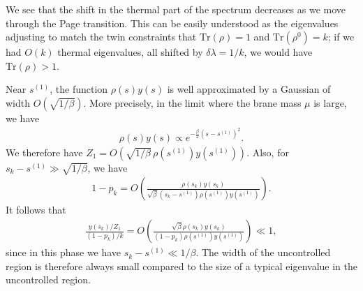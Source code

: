\documentclass[11pt]{article}
\newcommand{\smax}{s_k}
\numberwithin{equation}{section}
\def\Tr{\text{Tr}}
\begin{document}
We see that the shift in the thermal part of the spectrum decreases as we move through the Page transition. This can be easily understood as the eigenvalues adjusting to match the twin constraints that $\Tr(\rho) = 1$ and $\Tr(\rho^0) = k$; if we had $O(k)$ thermal eigenvalues, all shifted by $\delta \lambda = 1/k$, we would have $\Tr(\rho) > 1$.

Near $s^{(1)}$, the function $\rho(s) y(s)$ is well approximated by a Gaussian of width $O(\sqrt{1/\beta})$. More precisely, in the limit where the brane mass $\mu$ is large, we have
\begin{align}
\rho(s)y(s) \propto e^{- \frac{\beta}{2} (s -s^{(1)})^2}.
\end{align}
We therefore have $Z_1 = O(\sqrt{1/\beta}\, \rho(s^{(1)}) y(s^{(1)}))$. Also, for $\smax - s^{(1)} \gg \sqrt{1/\beta}$, we have
\begin{align}
1 - p_k = O\left( \frac{\rho(\smax) y(\smax)}{\sqrt{\beta}(\smax - s^{(1)})\rho(s^{(1)}) y(s^{(1)})}\right).
\end{align}
It follows that
\begin{align}
\frac{y(\smax)/Z_1}{(1-p_k)/ k}  = O\left(\frac{\sqrt{\beta}\rho(\smax) y(\smax)}{(1-p_k) \rho(s^{(1)}) y(s^{(1)})}\right) \ll 1,
\end{align}
since in this phase we have $\smax - s^{(1)} \ll 1/\beta$. The width of the uncontrolled region is therefore always small compared to the size of a typical eigenvalue in the uncontrolled region.
\end{document}
